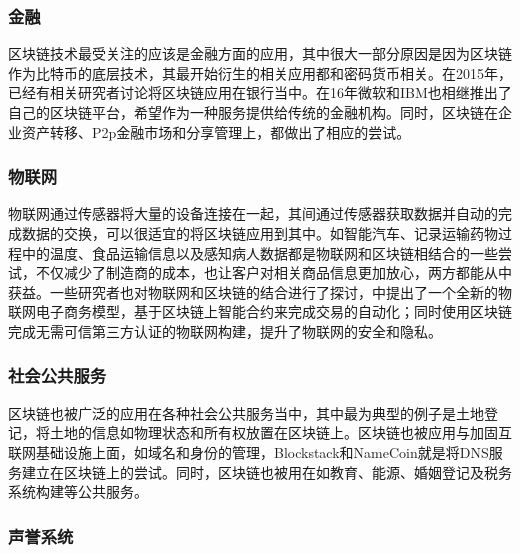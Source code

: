 
\subsubsection{金融}

区块链技术最受关注的应该是金融方面的应用，其中很大一部分原因是因为区块链作为比特币的底层技术，其最开始衍生的相关应用都和密码货币相关。在2015年，已经有相关研究者讨论将区块链应用在银行当中\supercite{peters2015trends}。在16年微软和IBM也相继推出了自己的区块链平台，希望作为一种服务提供给传统的金融机构。同时，区块链在企业资产转移、P2p金融市场和分享管理上，都做出了相应的尝试。

\subsubsection{物联网}

物联网通过传感器将大量的设备连接在一起，其间通过传感器获取数据并自动的完成数据的交换，可以很适宜的将区块链应用到其中。如智能汽车、记录运输药物过程中的温度\supercite{bocek2017blockchains}、食品运输信息\supercite{schneider2017design}以及感知病人数据都是物联网和区块链相结合的一些尝试，不仅减少了制造商的成本，也让客户对相关商品信息更加放心，两方都能从中获益。一些研究者也对物联网和区块链的结合进行了探讨，\parencite{hardjono2016cloud}中提出了一个全新的物联网电子商务模型，基于区块链上智能合约来完成交易的自动化；同时使用区块链完成无需可信第三方认证的物联网构建，提升了物联网的安全和隐私。


\subsubsection{社会公共服务}

区块链也被广泛的应用在各种社会公共服务当中，其中最为典型的例子是土地登记，将土地的信息如物理状态和所有权放置在区块链上\supercite{survey2015blockchain}。区块链也被应用与加固互联网基础设施上面，如域名和身份的管理，Blockstack\supercite{ali2016blockstack}和NameCoin\supercite{loibl2014namecoin}就是将DNS服务建立在区块链上的尝试。同时，区块链也被用在如教育、能源、婚姻登记及税务系统构建\supercite{akins2014whole}等公共服务。

\subsubsection{声誉系统}

